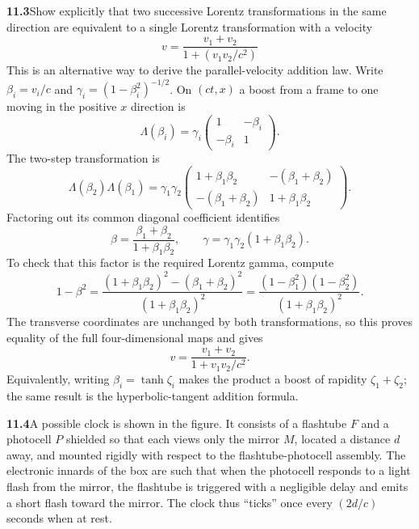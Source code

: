 \par\bigskip
\noindent\textbf{11.3}\quad Show explicitly that two successive Lorentz transformations in the same direction are equivalent to a single Lorentz transformation with a velocity
\[
v=\frac{v_{1}+v_{2}}{1+(v_{1}v_{2}/c^{2})}
\]
This is an alternative way to derive the parallel-velocity addition law.
\solution
Write $\beta_i=v_i/c$ and $\gamma_i=(1-\beta_i^2)^{-1/2}$.
On $(ct,x)$ a boost from a frame to one moving in the positive
$x$ direction is
\[
\Lambda(\beta_i)=\gamma_i
\begin{pmatrix}1&-\beta_i\\-\beta_i&1\end{pmatrix}.
\]
The two-step transformation is
\[
\Lambda(\beta_2)\Lambda(\beta_1)
=\gamma_1\gamma_2
\begin{pmatrix}
1+\beta_1\beta_2&-(\beta_1+\beta_2)\\
-(\beta_1+\beta_2)&1+\beta_1\beta_2
\end{pmatrix}.
\]
Factoring out its common diagonal coefficient identifies
\[
\beta=\frac{\beta_1+\beta_2}{1+\beta_1\beta_2},\qquad
\gamma=\gamma_1\gamma_2(1+\beta_1\beta_2).
\]
To check that this factor is the required Lorentz gamma, compute
\[
1-\beta^2
=\frac{(1+\beta_1\beta_2)^2-(\beta_1+\beta_2)^2}
{(1+\beta_1\beta_2)^2}
=\frac{(1-\beta_1^2)(1-\beta_2^2)}{(1+\beta_1\beta_2)^2}.
\]
The transverse coordinates are unchanged by both transformations,
so this proves equality of the full four-dimensional maps and gives
\[
\boxed{v=\frac{v_1+v_2}{1+v_1v_2/c^2}.}
\]
Equivalently, writing $\beta_i=\tanh\zeta_i$ makes the product a
boost of rapidity $\zeta_1+\zeta_2$; the same result is the
hyperbolic-tangent addition formula.

\par\bigskip
\noindent\textbf{11.4}\quad A possible clock is shown in the figure. It consists of a flashtube $F$ and a photocell $P$ shielded so that each views only the mirror $M$, located a distance $d$ away, and mounted rigidly with respect to the flashtube-photocell assembly. The electronic innards of the box are such that when the photocell responds to a light flash from the mirror, the flashtube is triggered with a negligible delay and emits a short flash toward the mirror. The clock thus ``ticks'' once every $(2d/c)$ seconds when at rest.

